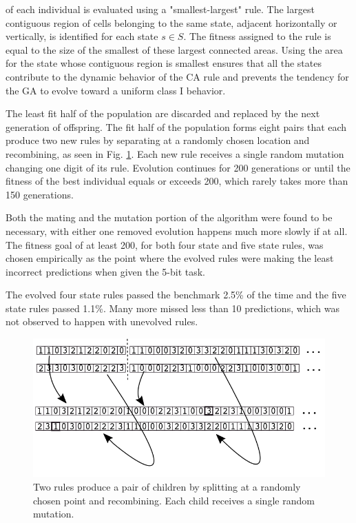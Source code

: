 \documentclass{elsarticle}
\begin{document}
\begin{multicols}{2}
     of each individual is evaluated using a "smallest-largest" rule.  The 
     largest contiguous region of cells belonging to the same state, adjacent 
     horizontally or vertically, is identified for each state $s \in S$. The 
     fitness assigned to the rule is equal to the size of the smallest of these 
     largest connected areas. Using the area for the state whose contiguous 
     region is smallest ensures that all the states contribute to the dynamic 
     behavior of the CA rule and prevents the tendency for the GA to evolve 
     toward a uniform class I behavior. \par The least fit half of the 
     population are discarded and replaced by the next generation of offspring.  
     The fit half of the population forms eight pairs that each produce two new 
     rules by separating at a randomly chosen location and recombining, as seen 
     in Fig. \ref{GA}. Each new rule receives a single random mutation changing 
     one digit of its rule. Evolution continues for 200 generations or until 
     the fitness of the best individual equals or exceeds 200, which rarely 
     takes more than 150 generations.  \par Both the mating and the mutation 
     portion of the algorithm were found to be necessary, with either one 
     removed evolution happens much more slowly if at all. The fitness goal of 
     at least 200, for both four state and five state rules, was chosen 
     empirically as the point where the evolved rules were making the least 
     incorrect predictions when given the 5-bit task. \par
     The evolved four state rules passed the benchmark 2.5\% of the time and 
     the five state rules passed 1.1\%. Many more missed less than 10 
     predictions, which was not observed to happen with unevolved rules.




\begin{figure}[H]
  \centering
    \includegraphics[width=\linewidth]{GA.png}
  \caption{Two rules produce a pair of children by splitting at a randomly 
      chosen point and recombining. Each child receives a single random 
          mutation.}
  \label{GA}
  \end{figure}


\end{multicols}
\end{document}
